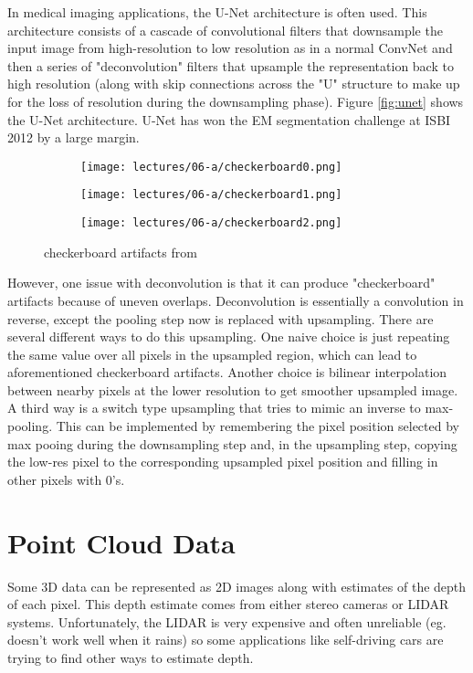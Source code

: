 In medical imaging applications, the U-Net architecture is often used. This architecture consists of a cascade of convolutional filters that downsample the input image from high-resolution to low resolution as in a normal ConvNet and then a series of "deconvolution" filters that upsample the representation back to high resolution (along with skip connections across the "U" structure to make up for the loss of resolution during the downsampling phase). Figure \ref{fig:unet} shows the U-Net architecture. U-Net has won the EM segmentation challenge at ISBI 2012 by a large margin.

\begin{figure}[ht]
    \centering
    \begin{subfigure}{0.25\textwidth}
    \texttt{[image: lectures/06-a/checkerboard0.png]} 
    \end{subfigure}
    \begin{subfigure}{0.25\textwidth}
    \texttt{[image: lectures/06-a/checkerboard1.png]}
    \end{subfigure}
    \begin{subfigure}{0.25\textwidth}
    \texttt{[image: lectures/06-a/checkerboard2.png]}
    \end{subfigure}
    \caption{checkerboard artifacts from \citep{odena2016deconvolution}}
    \label{fig:checkerboard}
\end{figure}

However, one issue with deconvolution is that it can produce "checkerboard" artifacts because of uneven overlaps. Deconvolution is essentially a convolution in reverse, except the pooling step now is replaced with upsampling. There are several different ways to do this upsampling. One naive choice is just repeating the same value over all pixels in the upsampled region, which can lead to aforementioned checkerboard artifacts. Another choice is bilinear interpolation between nearby pixels at the lower resolution to get smoother upsampled image. A third way is a switch type upsampling that tries to mimic an inverse to max-pooling. This can be implemented by remembering the pixel position selected by max pooing during the downsampling step and, in the upsampling step, copying the low-res pixel to the corresponding upsampled pixel position and filling in other pixels with 0's.
\section{Point Cloud Data}
Some 3D data can be represented as 2D images along with estimates of the depth of each pixel. This depth estimate comes from either stereo cameras or LIDAR systems. Unfortunately, the LIDAR is very expensive and often unreliable (eg. doesn't work well when it rains) so some applications like self-driving cars are trying to find other ways to estimate depth.

